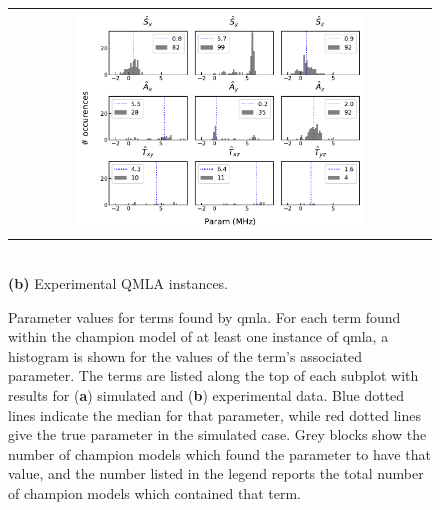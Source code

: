 \begin{figure}
    \centering
    \begin{tabular}{@{}c@{}}
        \centering
        \includegraphics[width=0.7\textwidth]{experimental_study/figures/params_experimental.pdf}
    \end{tabular}
    \\
    \small \textbf{(b)} Experimental QMLA instances.
    \caption[
        Histograms for parameters learned by QMLA champion models on simulated and experimental data
    ]{
        Parameter values for terms found by \gls{qmla}. 
        For each term found within the \gls{champion model} of at least one \gls{instance} of \gls{qmla}, 
            a histogram is shown for the values of the term's associated parameter.
        The terms are listed along the top of each subplot with results for (\textbf{a}) simulated  and (\textbf{b}) experimental data. 
        Blue dotted lines indicate the median for that parameter, while red dotted lines give the true parameter in the simulated case. 
        Grey blocks show the number of champion models which found the parameter to have that value,
        and the number listed in the legend reports the total number of \glspl{champion model} which contained that term.
        \figtableref
    }
    \label{fig:nv_learned_params}
\end{figure}


